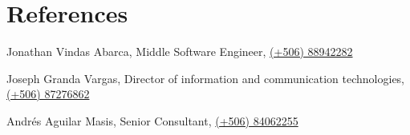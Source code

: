 \documentclass[]{friggeri-cv}
\begin{document}
\section{References}
\begin{entrylist}
  \entry
    {}
    {Jonathan Vindas Abarca, Middle Software Engineer, \href{tel:88942282}{(+506) 88942282}}
    {}
    
    \entry
    {}
    {Joseph Granda Vargas, Director of information and communication technologies, \href{tel:87276862}{(+506) 87276862}}
    {}
    
    \entry
    {}
    {Andrés Aguilar Masis, Senior Consultant, \href{tel:84062255}{(+506) 84062255}}
    {}

\end{entrylist} 
\end{document}
